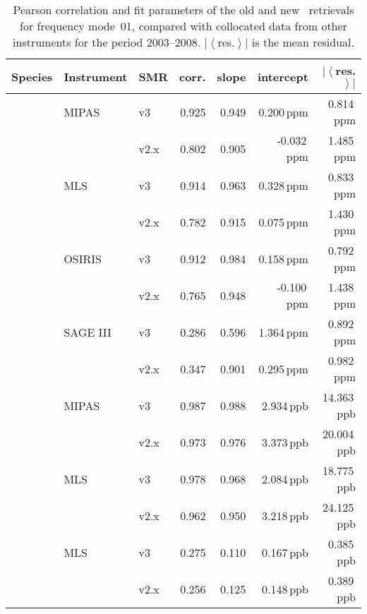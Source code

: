 \begin{table}[tbhp]
\centering
\caption{Pearson correlation and fit parameters of the old and new \smr\
retrievals for frequency mode~01, compared with collocated data from other
instruments for the period 2003--2008.
$\left|\left<\right.\right.$res.$\left.\left.\right>\right|$ is the mean
residual.}
\label{tab:fm01:stats}
\begin{tabular}{lllrrrr}
    \toprule
    \textbf{Species} & \textbf{Instrument} & \textbf{SMR} & \textbf{corr.} & \textbf{slope} & \textbf{intercept} & \textbf{$\left|\left<\right.\right.$res.$\left.\left.\right>\right|$} \\
    \midrule
    \chem{O3}   & MIPAS     & v3    & 0.925 & 0.949 & 0.200\,ppm    &  0.814\,ppm \\
                &           & v2.x  & 0.802 & 0.905 & -0.032\,ppm   &  1.485\,ppm \\
    \cline{2-7}
                & MLS       & v3    & 0.914 & 0.963 & 0.328\,ppm    &  0.833\,ppm \\
                &           & v2.x  & 0.782 & 0.915 & 0.075\,ppm    &  1.430\,ppm \\
    \cline{2-7}
                & OSIRIS    & v3    & 0.912 & 0.984 & 0.158\,ppm    &  0.792\,ppm \\
                &           & v2.x  & 0.765 & 0.948 & -0.100\,ppm   &  1.438\,ppm \\
    \cline{2-7}
                & SAGE III  & v3    & 0.286 & 0.596 & 1.364\,ppm    &  0.892\,ppm \\
                &           & v2.x  & 0.347 & 0.901 & 0.295\,ppm    &  0.982\,ppm \\
    \midrule
    \chem{N_2O} & MIPAS     & v3    & 0.987 & 0.988 & 2.934\,ppb    & 14.363\,ppb \\
                &           & v2.x  & 0.973 & 0.976 & 3.373\,ppb    & 20.004\,ppb \\
    \cline{2-7}
                & MLS       & v3    & 0.978 & 0.968 & 2.084\,ppb    & 18.775\,ppb \\
                &           & v2.x  & 0.962 & 0.950 & 3.218\,ppb    & 24.125\,ppb \\
    \midrule
    \chem{ClO}  & MLS       & v3    & 0.275 & 0.110 & 0.167\,ppb    &  0.385\,ppb \\
                &           & v2.x  & 0.256 & 0.125 & 0.148\,ppb    &  0.389\,ppb \\
    \bottomrule
\end{tabular}
\end{table}


